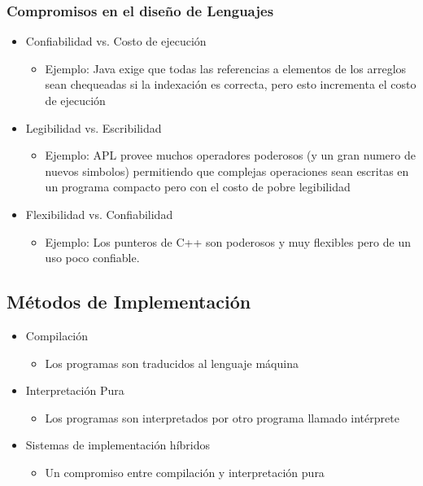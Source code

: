 \documentclass[11pt]{article}
\begin{document}
\subsubsection*{Compromisos en el diseño de Lenguajes}
\label{sec:orgheadline13}
\begin{itemize}
\item Confiabilidad vs. Costo de ejecución
\begin{itemize}
\item Ejemplo: Java exige que todas las referencias a elementos de los
arreglos sean chequeadas si la indexación es correcta, pero esto
incrementa el costo de ejecución
\end{itemize}
\item Legibilidad vs. Escribilidad
\begin{itemize}
\item Ejemplo: APL provee muchos operadores poderosos (y un gran numero
de nuevos simbolos) permitiendo que complejas operaciones sean
escritas en un programa compacto pero con el costo de pobre legibilidad
\end{itemize}
\item Flexibilidad vs. Confiabilidad
\begin{itemize}
\item Ejemplo: Los punteros de C++ son poderosos y muy flexibles pero de
un uso poco confiable.
\end{itemize}
\end{itemize}

\subsection*{Métodos de Implementación}
\label{sec:orgheadline28}
\begin{itemize}
\item Compilación
\begin{itemize}
\item Los programas son traducidos al lenguaje máquina
\end{itemize}
\item Interpretación Pura
\begin{itemize}
\item Los programas son interpretados por otro programa llamado intérprete
\end{itemize}
\item Sistemas de implementación híbridos
\begin{itemize}
\item Un compromiso entre compilación y interpretación pura
\end{itemize}
\end{itemize}
\end{document}
